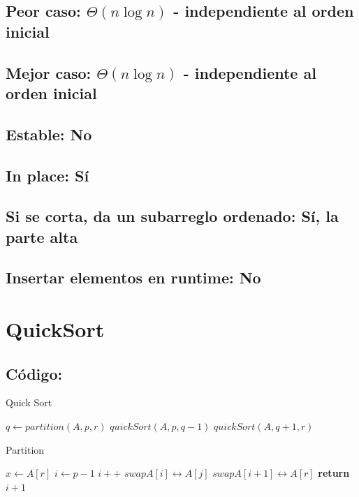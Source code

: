 \documentclass[a4paper]{article}
\begin{document}
\subsection{Peor caso: $\Theta (n \log{} n)$ - independiente al orden inicial}
\subsection{Mejor caso: $\Theta (n \log{} n)$ - independiente al orden inicial}
\subsection{Estable: No}
\subsection{In place: S\'i}
\subsection{Si se corta, da un subarreglo ordenado: S\'i, la parte alta}
\subsection{Insertar elementos en runtime: No}

\newpage
\section{QuickSort}

\subsection{C\'odigo:}
\begin{algorithm}
\caption{Quick Sort}\label{selection}
\begin{algorithmic}[1]
		\State $q \gets partition(A,p,r)$
		\State $quickSort(A,p,q-1)$
		\State $quickSort(A,q+1,r)$
	\EndIf
\EndProcedure
\end{algorithmic}
\end{algorithm}

\begin{algorithm}
\caption{Partition}\label{selection}
\begin{algorithmic}[1]
	\State $x \gets A[r]$
	\State $i \gets p-1$
			\State $i++$
			\State $swap A[i] \leftrightarrow A[j]$
		\EndIf
	\EndFor
	\State $swap A[i+1] \leftrightarrow A[r]$
	\State \textbf{return} $i+1$
\EndProcedure
\end{algorithmic}
\end{algorithm}
\end{document}
